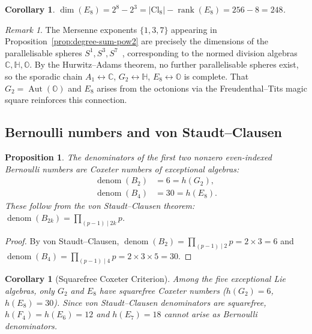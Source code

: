 \documentclass[11pt]{amsart}
\theoremstyle{plain}
\newtheorem{proposition}[theorem]{Proposition}
\newtheorem{corollary}[theorem]{Corollary}
\theoremstyle{definition}
\theoremstyle{remark}
\newtheorem{remark}[theorem]{Remark}
\newcommand{\rank}{\operatorname{rank}}
\newcommand{\Aut}{\operatorname{Aut}}
\newcommand{\denom}{\operatorname{denom}}
\begin{document}
\begin{corollary}\label{cor:clifford-dim}
$\dim(E_8) = 2^8 - 2^3 = |\mathrm{Cl}_8| - \rank(E_8) = 256 - 8 = 248$.
\end{corollary}

\begin{remark}\label{rem:division-algebras}
The Mersenne exponents $\{1, 3, 7\}$ appearing in
Proposition~\ref{prop:degree-sum-pow2} are precisely the dimensions of
the parallelisable spheres $S^1, S^3, S^7$~\cite{Adams1962},
corresponding to the normed division algebras
$\mathbb{C}, \mathbb{H}, \mathbb{O}$.  By the Hurwitz--Adams theorem,
no further parallelisable spheres exist, so the sporadic chain
$A_1 \leftrightarrow \mathbb{C}$, $G_2 \leftrightarrow \mathbb{H}$,
$E_8 \leftrightarrow \mathbb{O}$ is complete.  That $G_2 = \Aut(\mathbb{O})$
and $E_8$ arises from the octonions via the Freudenthal--Tits magic
square reinforces this connection.
\end{remark}

\subsection{Bernoulli numbers and von Staudt--Clausen}

\begin{proposition}\label{prop:bernoulli}
The denominators of the first two nonzero even-indexed Bernoulli numbers
are Coxeter numbers of exceptional algebras:
\begin{align*}
  \denom(B_2) &= 6 = h(G_2), \\
  \denom(B_4) &= 30 = h(E_8).
\end{align*}
These follow from the von Staudt--Clausen theorem: $\denom(B_{2k})
= \prod_{(p-1) \mid 2k} p$.
\end{proposition}

\begin{proof}
By von Staudt--Clausen, $\denom(B_2) = \prod_{(p-1) \mid 2} p = 2 \times 3 = 6$
and $\denom(B_4) = \prod_{(p-1) \mid 4} p = 2 \times 3 \times 5 = 30$.
\end{proof}

\begin{corollary}[Squarefree Coxeter Criterion]\label{cor:squarefree}
Among the five exceptional Lie algebras, only $G_2$ and $E_8$ have
squarefree Coxeter numbers ($h(G_2) = 6$, $h(E_8) = 30$).  Since
von Staudt--Clausen denominators are squarefree, $h(F_4) = h(E_6) = 12$
and $h(E_7) = 18$ cannot arise as Bernoulli denominators.
\end{corollary}
\end{document}
